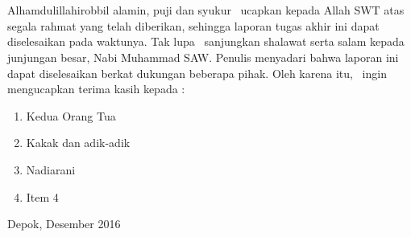 \chapter*{\kataPengantar}

Alhamdulillahirobbil alamin, puji dan syukur \saya~ucapkan kepada Allah SWT atas segala rahmat yang telah diberikan, sehingga laporan tugas akhir ini dapat diselesaikan pada waktunya. Tak lupa \saya~sanjungkan shalawat serta salam kepada junjungan besar, Nabi Muhammad SAW. Penulis menyadari bahwa laporan ini dapat diselesaikan berkat dukungan beberapa pihak. Oleh karena itu, \saya~ingin mengucapkan terima kasih kepada :

\begin{enumerate}
	\item Kedua Orang Tua \saya
	\item Kakak dan adik-adik \saya
	\item Nadiarani
	\item Item 4
	
\end{enumerate}
\vspace*{0.1cm}
\begin{flushright}
	Depok, Desember 2016\\[0.1cm]
	\vspace*{1cm}
	\penulis
	
\end{flushright}